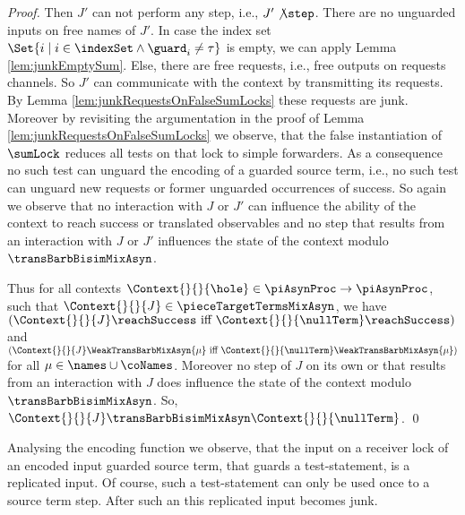 \documentclass[]{llncs}
\begin{document}
\begin{proof}
	Then $ J' $ can not perform any step, i.e., $ J' \not\step $. There are no unguarded inputs on free names of $ J' $. In case the index set $ \Set{ i \mid i \in \indexSet \wedge \guard_i \neq \tau } $ is empty, we can apply Lemma \ref{lem:junkEmptySum}. Else, there are free requests, i.e., free outputs on requests channels. So $ J' $ can communicate with the context by transmitting its requests. By Lemma \ref{lem:junkRequestsOnFalseSumLocks} these requests are junk. Moreover by revisiting the argumentation in the proof of Lemma \ref{lem:junkRequestsOnFalseSumLocks} we observe, that the false instantiation of $ \sumLock $ reduces all tests on that lock to simple forwarders. As a consequence no such test can unguard the encoding of a guarded source term, i.e., no such test can unguard new requests or former unguarded occurrences of success. So again we observe that no interaction with $ J $ or $ J' $ can influence the ability of the context to reach success or translated observables and no step that results from an interaction with $ J $ or $ J' $ influences the state of the context modulo $ \transBarbBisimMixAsyn $.
	
	Thus for all contexts $ \Context{}{}{\hole} \in \piAsynProc \to \piAsynProc $, such that $ \Context{}{}{J} \in \pieceTargetTermsMixAsyn $, we have $ \left( \Context{}{}{J}\reachSuccess \text{ iff } \Context{}{}{\nullTerm}\reachSuccess \right) $ and $ \left( \Context{}{}{J}\WeakTransBarbMixAsyn{\mu} \text{ iff } \Context{}{}{\nullTerm}\WeakTransBarbMixAsyn{\mu} \right) $ for all $ \mu \in \names \cup \coNames $. Moreover no step of $ J $ on its own or that results from an interaction with $ J $ does influence the state of the context modulo $ \transBarbBisimMixAsyn $. So, $ \Context{}{}{J} \transBarbBisimMixAsyn \Context{}{}{\nullTerm} $.
	\qed
\end{proof}

Analysing the encoding function we observe, that the input on a receiver lock of an encoded input guarded source term, that guards a test-statement, is a replicated input. Of course, such a test-statement can only be used once to \simulate a source term step. After such an \simulation this replicated input becomes junk.
\end{document}
